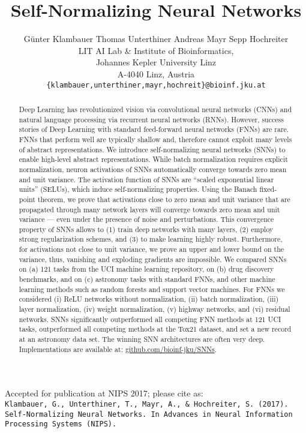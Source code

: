 \documentclass{article}
\title{Self-Normalizing Neural Networks}
\author{
 G\"{u}nter Klambauer
 \And 
 Thomas Unterthiner
 \And
 Andreas Mayr
 \And 
 Sepp Hochreiter \\ 
 LIT AI Lab \& Institute of Bioinformatics, \\
 Johannes Kepler University Linz\\
 A-4040 Linz, Austria\\
\texttt{\{klambauer,unterthiner,mayr,hochreit\}@bioinf.jku.at}
}
\begin{document}
\renewcommand\indexname{Brief index}
\maketitle

\begin{abstract}
Deep Learning has revolutionized vision via convolutional neural networks (CNNs) 
and natural language processing via recurrent neural networks (RNNs).
However, success stories of Deep Learning with 
standard feed-forward neural networks (FNNs) are rare. 
FNNs that perform well are typically shallow 
and, therefore cannot exploit many levels of abstract representations. 
We introduce self-normalizing neural networks (SNNs) to
enable high-level abstract representations.
While batch normalization requires explicit normalization, 
neuron activations of SNNs 
automatically converge towards zero mean and unit variance. 
The activation function of SNNs are ``scaled exponential linear units''
(SELUs), which induce self-normalizing properties.
Using the Banach fixed-point theorem, 
we prove that activations close to zero mean and unit variance 
that are propagated through many network layers will converge 
towards zero mean and unit variance ---
even under the presence of noise and perturbations.
This convergence property of SNNs allows to (1) train deep networks with many layers, (2) employ strong regularization schemes, and (3) to make learning highly robust. 
Furthermore, for activations not close to unit  
variance, we prove an upper and lower bound 
on the variance, thus, vanishing and exploding gradients are impossible.
We compared SNNs on (a) 121 tasks from the UCI machine learning repository, 
on (b) drug discovery benchmarks, and on (c) astronomy tasks
with standard FNNs, and other machine learning methods such as random forests and support vector machines.
For FNNs we considered  
(i) ReLU networks without normalization, (ii) batch normalization, (iii) layer normalization, (iv) weight normalization,
(v) highway networks, and (vi) residual networks. 
SNNs significantly outperformed all competing FNN methods at
121 UCI tasks, outperformed all competing methods 
at the Tox21 dataset, and set a new record at an astronomy data set. 
The winning SNN architectures are often very deep. Implementations are available at: \href{https://www.github.com/bioinf-jku/SNNs}{github.com/bioinf-jku/SNNs}.
\end{abstract}

Accepted for publication at NIPS 2017; please cite as: \\
{\tt Klambauer, G., Unterthiner, T., Mayr, A., \& Hochreiter, S. (2017). Self-Normalizing Neural Networks. In Advances in Neural Information Processing Systems (NIPS).}
\end{document}
